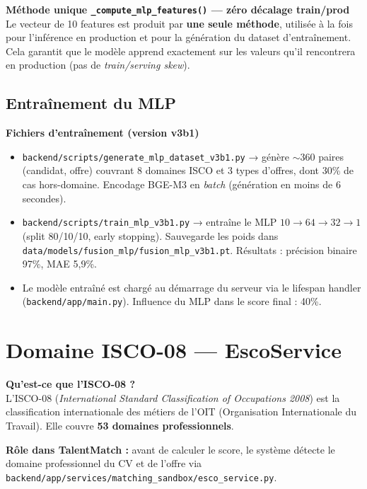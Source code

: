 \documentclass[12pt,a4paper]{report}
\newenvironment{infobox}[1][]{%
  \begin{framed}\noindent\textbf{\textcolor{navyblue}{#1}}\\[2pt]%
}{\end{framed}}
\newcommand{\filepath}[1]{\texttt{\small\textcolor{codeblue}{#1}}}
\begin{document}
\begin{infobox}[Méthode unique \texttt{\_compute\_mlp\_features()} — zéro décalage train/prod]
Le vecteur de 10 features est produit par \textbf{une seule méthode}, utilisée à la
fois pour l'inférence en production et pour la génération du dataset d'entraînement.
Cela garantit que le modèle apprend exactement sur les valeurs qu'il rencontrera en
production (pas de \textit{train/serving skew}).
\end{infobox}

\subsection{Entraînement du MLP}

\begin{infobox}[Fichiers d'entraînement (version v3b1)]
\begin{itemize}
  \item \filepath{backend/scripts/generate\_mlp\_dataset\_v3b1.py}
        → génère $\sim$360 paires (candidat, offre) couvrant 8 domaines ISCO et
        3 types d'offres, dont 30\% de cas hors-domaine. Encodage BGE-M3 en
        \textit{batch} (génération en moins de 6 secondes).
  \item \filepath{backend/scripts/train\_mlp\_v3b1.py}
        → entraîne le MLP $10\to64\to32\to1$ (split 80/10/10, early stopping).
        Sauvegarde les poids dans \filepath{data/models/fusion\_mlp/fusion\_mlp\_v3b1.pt}.
        Résultats : précision binaire 97\%, MAE 5,9\%.
  \item Le modèle entraîné est chargé au démarrage du serveur via le lifespan handler
        (\filepath{backend/app/main.py}). Influence du MLP dans le score final : 40\%.
\end{itemize}
\end{infobox}

\section{Domaine ISCO-08 — EscoService}

\begin{infobox}[Qu'est-ce que l'ISCO-08 ?]
L'ISCO-08 (\textit{International Standard Classification of Occupations 2008}) est
la classification internationale des métiers de l'OIT (Organisation Internationale
du Travail). Elle couvre \textbf{53 domaines professionnels}.
\end{infobox}

\textbf{Rôle dans TalentMatch :} avant de calculer le score, le système détecte
le domaine professionnel du CV et de l'offre via
\filepath{backend/app/services/matching\_sandbox/esco\_service.py}.
\end{document}
